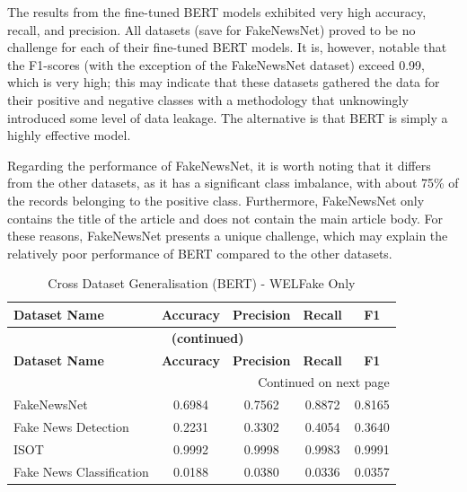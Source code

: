 \documentclass[
]{article}
\begin{document}
The results from the fine-tuned BERT models exhibited very high accuracy, recall, and precision. All datasets (save for FakeNewsNet) proved to be no challenge for each of their fine-tuned BERT models. It is, however, notable that the F1-scores (with the exception of the FakeNewsNet dataset) exceed 0.99, which is very high; this may indicate that these datasets gathered the data for their positive and negative classes with a methodology that unknowingly introduced some level of data leakage. The alternative is that BERT is simply a highly effective model.

Regarding the performance of FakeNewsNet, it is worth noting that it differs from the other datasets, as it has a significant class imbalance, with about 75\% of the records belonging to the positive class. Furthermore, FakeNewsNet only contains the title of the article and does not contain the main article body. For these reasons, FakeNewsNet presents a unique challenge, which may explain the relatively poor performance of BERT compared to the other datasets.

\begingroup
\setlength{\tabcolsep}{3pt}
\renewcommand{\arraystretch}{1.3}
\setlength\LTleft{0pt}
\setlength\LTright{0pt}
\begin{longtable}{@{} l c c c c @{}}
\caption{Cross Dataset Generalisation (BERT) - WELFake Only} \label{tab:bert_cross_results} \\
\toprule
\textbf{Dataset Name} & \textbf{Accuracy} & \textbf{Precision} & \textbf{Recall} & \textbf{F1} \\
\midrule
\endfirsthead

\multicolumn{5}{c}{{\bfseries \tablename\ \thetable{} (continued)}} \\
\toprule
\textbf{Dataset Name} & \textbf{Accuracy} & \textbf{Precision} & \textbf{Recall} & \textbf{F1} \\
\midrule
\endhead

\bottomrule
\multicolumn{5}{r}{{Continued on next page}} \\
\endfoot

\bottomrule
\endlastfoot
FakeNewsNet & 0.6984 & 0.7562 & 0.8872 & 0.8165 \\
Fake News Detection & 0.2231 & 0.3302 & 0.4054 & 0.3640 \\
ISOT & 0.9992 & 0.9998 & 0.9983 & 0.9991 \\
Fake News Classification & 0.0188 & 0.0380 & 0.0336 & 0.0357 \\
\end{longtable}
\endgroup
\end{document}
